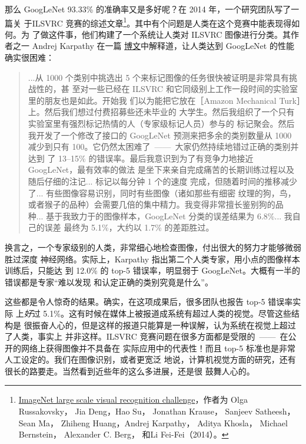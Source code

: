 那么 GoogLeNet 93.33\% 的准确率又是多好呢？在 2014 年，一个研究团队写了一篇关
于ILSVRC 竞赛的综述文章\footnote{\href{http://arxiv.org/abs/1409.0575}{ImageNet
    large scale visual recognition challenge}，作者为 Olga Russakovsky， Jia
  Deng，Hao Su， Jonathan Krause， Sanjeev Satheesh， Sean Ma， Zhiheng
  Huang，Andrej Karpathy， Aditya Khosla， Michael Bernstein， Alexander C.
  Berg， 和Li Fei-Fei（2014）。}。其中有个问题是人类在这个竞赛中能表现得如何。为
了做这件事，他们构建了一个系统让人类对 ILSVRC 图像进行分类。其作者之一 Andrej
Karpathy 在一篇%
\href{http://karpathy.github.io/2014/09/02/what-i-learned-from-competing-against-a-convnet-on-imagenet/}{%
  博文}中解释道，让人类达到 GoogLeNet 的性能确实很困难：

\begin{quote}
  ...从 1000 个类别中挑选出 5 个来标记图像的任务很快被证明是非常具有挑战性的，甚
  至对一些已经在 ILSVRC 和它同级别上工作一段时间的实验室里的朋友也是如此。开始我
  们以为能把它放在［Amazon Mechanical Turk］上。然后我们想过付费招募些还未毕业的
  大学生。然后我组织了一个只有实验室里有强烈标记热情的人（专家级标记人员）参与的
  标记聚会。然后我开发了一个修改了接口的 GoogLeNet 预测来把多余的类别数量从 1000
  减少到只有 100。它仍然太困难了~——~大家仍然持续地错过正确的类别并达到
  了 13--15\% 的错误率。最后我意识到为了有竞争力地接近 GoogLeNet，最有效率的做法
  是坐下来亲自完成痛苦的长期训练过程以及随后仔细的注记... 标记以每分钟 1 个的速度
  完成，但随着时间的推移减少了... 有些图像容易识别，同时有些图像（诸如那些有细密
  纹理的狗，鸟，或者猴子的品种）会需要几倍的集中精力。我变得非常擅长鉴别狗的品
  种... 基于我致力于的图像样本，GoogLeNet 分类的误差结果为 6.8\%... 我自己的误差
  最终为 5.1\%，大约以 1.7\% 的差距胜过。
\end{quote}

换言之，一个专家级别的人类，非常细心地检查图像，付出很大的努力才能够微弱胜过深度
神经网络。实际上，Karpathy 指出第二个人类专家，用小点的图像样本训练后，只能达
到 12.0\% 的 top-5 错误率，明显弱于 GoogLeNet。大概有一半的错误都是专家“难以发现
和认定正确的类别究竟是什么”。

这些都是令人惊奇的结果。确实，在这项成果后，很多团队也报告 top-5 错误率实际
上\emph{好}过 5.1\%。这有时候在媒体上被报道成系统有超过人类的视觉。尽管这些结构是
很振奋人心的，但是这样的报道只能算是一种误解，认为系统在视觉上超过了人类，事实上
并非这样。ILSVRC 竞赛问题在很多方面都是受限的~——~在公开的网络上获得图像并不具备在
实际应用中的代表性！而且 top-5 标准也是非常人工设定的。我们在图像识别，或者更宽泛
地说，计算机视觉方面的研究，还有很长的路要走。当然看到近些年的这么多进展，还是很
鼓舞人心的。\\

